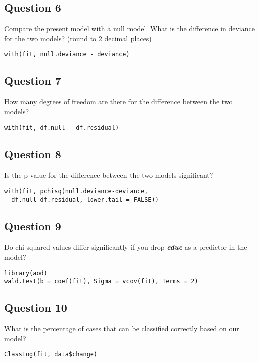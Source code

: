 \documentclass[12pt]{article}
\begin{document}
\subsection*{Question 6}
Compare the present model with a null model. What is the difference in deviance for the two models? (round to 2 decimal places)
\begin{framed}
\begin{verbatim}
with(fit, null.deviance - deviance)
\end{verbatim}
\end{framed}

\subsection*{Question 7}
How many degrees of freedom are there for the difference between the two models?
\begin{framed}
\begin{verbatim}
with(fit, df.null - df.residual)
\end{verbatim}
\end{framed}

\subsection*{Question 8}

Is the p-value for the difference between the two models significant?
\begin{framed}
\begin{verbatim}
with(fit, pchisq(null.deviance-deviance, 
  df.null-df.residual, lower.tail = FALSE))
\end{verbatim}
\end{framed}

\subsection*{Question 9}

Do chi-squared values differ significantly if you drop \textbf{\textit{educ}} as a predictor in the model?

\begin{framed}
\begin{verbatim}
library(aod)  
wald.test(b = coef(fit), Sigma = vcov(fit), Terms = 2)
\end{verbatim}
\end{framed}
\subsection*{Question 10}

What is the percentage of cases that can be classified correctly based on our model?

\begin{framed}
\begin{verbatim}
ClassLog(fit, data$change)
\end{verbatim}
\end{framed}
\end{document}
